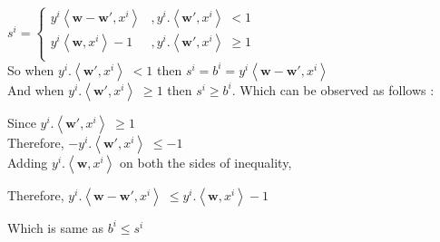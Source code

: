\documentclass[a4paper,11pt]{article}
\begin{document}
\begin{mlsolution}
\begin{math}
s^{i} = \left\{\begin{matrix}
y^{i} \left \langle \textbf{w} -\textbf{w}{}', x^{i} \right \rangle & ,y^{i}.\left \langle \textbf{w}{}', x^{i}\right \rangle \; <  1\\ 
y^{i}\left \langle \textbf{w}, x^{i}\right \rangle -1 & ,y^{i}.\left \langle \textbf{w}{}', x^{i}\right \rangle \; \geq  1\\ 

\end{matrix}\right.
\end{math}\\

So when \begin{math}y^{i}.\left \langle \textbf{w}{}', x^{i} \right \rangle \; <  1\end{math} then \; \begin{math} s^{i} = b^{i} = y^{i} \left \langle \textbf{w} -\textbf{w}{}', x^{i} \right \rangle \end{math} \\

And when \begin{math}y^{i}.\left \langle \textbf{w}{}', x^{i} \right \rangle \; \geq  1\end{math}
 then \; \begin{math} s^{i} \geq b^{i}\end{math}. Which can be observed as follows :
 
Since \begin{math} y^{i}.\left \langle \textbf{w}{}', x^{i} \right \rangle \; \geq  1 \end{math} \\
Therefore, \begin{math} - y^{i}.\left \langle \textbf{w}{}', x^{i} \right \rangle \; \leq  -1 \end{math}\\

Adding \begin{math} y^{i}.\left \langle \textbf{w}, x^{i} \right \rangle \end{math} on both the sides of inequality,

Therefore, \begin{math} y^{i}.\left \langle \textbf{w} - \textbf{w}{}', x^{i} \right \rangle \; \leq  y^{i}.\left \langle \textbf{w}, x^{i} \right \rangle - 1 \end{math}

Which is same as \begin{math} b^{i} \leq s^{i} \end{math}


\end{mlsolution}
\end{document}
